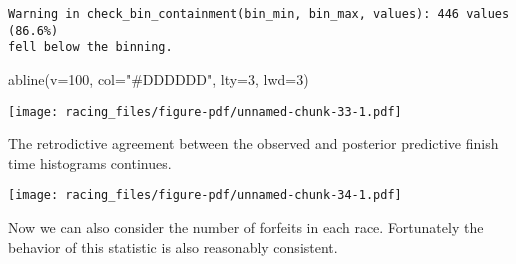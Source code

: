 \documentclass[
  letterpaper,
  DIV=11,
  numbers=noendperiod]{scrartcl}
\newenvironment{Shaded}{\begin{snugshade}}{\end{snugshade}}
\newcommand{\AttributeTok}[1]{\textcolor[rgb]{0.40,0.45,0.13}{#1}}
\newcommand{\DecValTok}[1]{\textcolor[rgb]{0.68,0.00,0.00}{#1}}
\newcommand{\FunctionTok}[1]{\textcolor[rgb]{0.28,0.35,0.67}{#1}}
\newcommand{\NormalTok}[1]{\textcolor[rgb]{0.00,0.23,0.31}{#1}}
\newcommand{\SpecialCharTok}[1]{\textcolor[rgb]{0.37,0.37,0.37}{#1}}
\newcommand{\StringTok}[1]{\textcolor[rgb]{0.13,0.47,0.30}{#1}}
\begin{document}
\begin{verbatim}
Warning in check_bin_containment(bin_min, bin_max, values): 446 values (86.6%)
fell below the binning.
\end{verbatim}

\begin{Shaded}
\begin{Highlighting}[]
\FunctionTok{abline}\NormalTok{(}\AttributeTok{v=}\DecValTok{100}\NormalTok{, }\AttributeTok{col=}\StringTok{"\#DDDDDD"}\NormalTok{, }\AttributeTok{lty=}\DecValTok{3}\NormalTok{, }\AttributeTok{lwd=}\DecValTok{3}\NormalTok{)}
\end{Highlighting}
\end{Shaded}

\texttt{[image: racing\_files/figure-pdf/unnamed-chunk-33-1.pdf]}

The retrodictive agreement between the observed and posterior predictive
finish time histograms continues.

\begin{Shaded}
\end{Shaded}

\texttt{[image: racing\_files/figure-pdf/unnamed-chunk-34-1.pdf]}

Now we can also consider the number of forfeits in each race.
Fortunately the behavior of this statistic is also reasonably
consistent.
\end{document}
